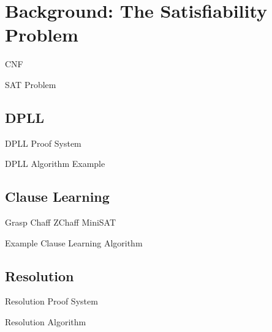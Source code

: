 \chapter{Background: The Satisfiability Problem}

CNF

SAT Problem

\section{DPLL}
DPLL Proof System

DPLL Algorithm Example

\section{Clause Learning}
Grasp
Chaff ZChaff
MiniSAT

Example Clause Learning Algorithm

\section{Resolution}

Resolution Proof System

Resolution Algorithm
